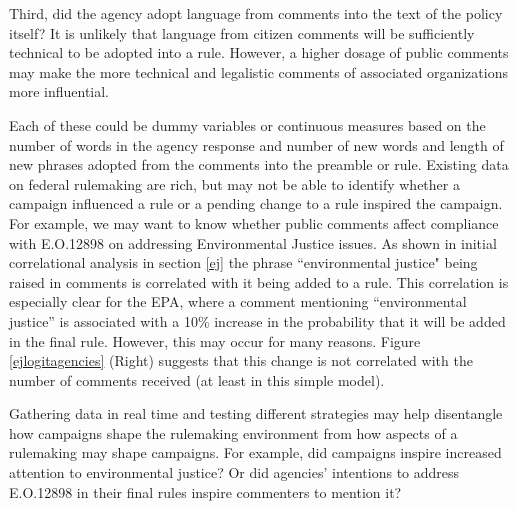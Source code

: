 Third, did the agency adopt language from comments into the text of the policy itself? It is unlikely that language from citizen comments will be sufficiently technical to be adopted into a rule. However, a higher dosage of public comments may make the more technical and legalistic comments of associated organizations more influential.

Each of these could be dummy variables or continuous measures based on the number of words in the agency response and number of new words and length of new phrases adopted from the comments into the preamble or rule. 
\noindent
Existing data on federal rulemaking are rich, but may not be able to identify whether a campaign influenced a rule or a pending change to a rule inspired the campaign.
For example, we may want to know whether public comments affect compliance with E.O.12898 on addressing Environmental Justice issues. As shown in initial correlational analysis in section \ref{ej}
the phrase ``environmental justice" being raised in comments is correlated with it being added to a rule. This correlation is especially clear for the EPA, where a comment mentioning ``environmental justice'' is associated with a 10\% increase in the probability that it will be added in the final rule. However, this may occur for many reasons. Figure \ref{ejlogitagencies} (Right) suggests that this change is not correlated with the number of comments received (at least in this simple model). %

Gathering data in real time and testing different strategies may help disentangle how campaigns shape the rulemaking environment from how aspects of a rulemaking may shape campaigns. For example, did campaigns inspire increased attention to environmental justice? Or did agencies' intentions to address E.O.12898 in their final rules inspire commenters to mention it? %
